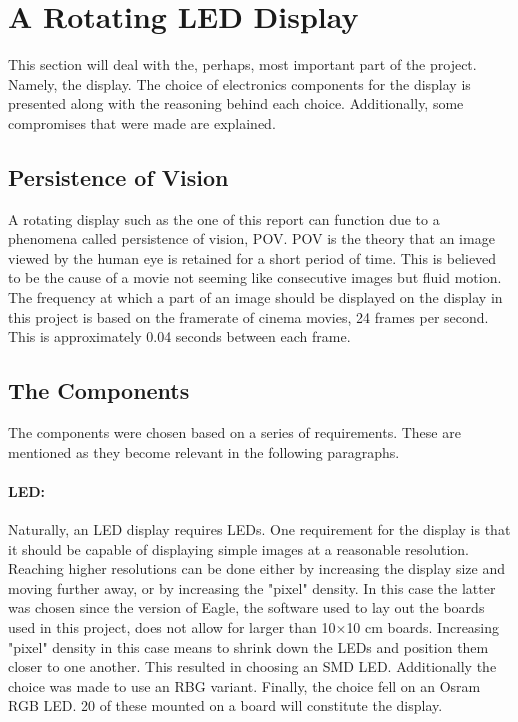 \section{A Rotating LED Display}
This section will deal with the, perhaps, most important part of the project.
Namely, the display.
The choice of electronics components for the display is presented along with the reasoning behind each choice.
Additionally, some compromises that were made are explained.

\subsection{Persistence of Vision}
A rotating display such as the one of this report can function due to a phenomena called persistence of vision, POV.
POV is the theory that an image viewed by the human eye is retained for a short period of time. 
This is believed to be the cause of a movie not seeming like consecutive images but fluid motion.
The frequency at which a part of an image should be displayed on the display in this project is based on the framerate of cinema movies, 24 frames per second.
This is approximately 0.04 seconds between each frame.

\subsection{The Components}
The components were chosen based on a series of requirements.
These are mentioned as they become relevant in the following paragraphs.

\paragraph{LED:}
Naturally, an LED display requires LEDs.
One requirement for the display is that it should be capable of displaying simple images at a reasonable resolution.
Reaching higher resolutions can be done either by increasing the display size and moving further away, or by increasing the "pixel" density.
In this case the latter was chosen since the version of Eagle, the software used to lay out the boards used in this project, does not allow for larger than 10$\times$10 cm boards.
Increasing "pixel" density in this case means to shrink down the LEDs and position them closer to one another.
This resulted in choosing an SMD LED.
Additionally the choice was made to use an RBG variant.
Finally, the choice fell on an Osram RGB LED.
20 of these mounted on a board will constitute the display.

